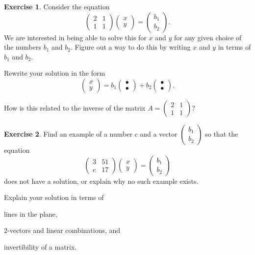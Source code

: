 \documentclass[11pt]{amsart}
\theoremstyle{definition}
\newtheorem{exercise}{Exercise}
\begin{document}
\begin{exercise}
Consider the equation
\[
\begin{pmatrix} 2 & 1 \\ 1 & 1 \end{pmatrix}\begin{pmatrix} x \\ y \end{pmatrix} = \begin{pmatrix} b_1 \\ b_2 \end{pmatrix}.
\]
We are interested in being able to solve this for $x$ and $y$ for any given choice of the numbers $b_1$ and $b_2$. Figure out a way to do this by writing $x$ and $y$ in terms of $b_1$ and $b_2$.

Rewrite your solution in the form
\[
\begin{pmatrix} x \\ y \end{pmatrix} = b_1 \begin{pmatrix} \bullet \\ \bullet\end{pmatrix} + b_2 \begin{pmatrix}  \bullet \\ \bullet \end{pmatrix}.
\]

How is this related to the inverse of the matrix $A = \left( \begin{smallmatrix} 2 & 1 \\ 1 & 1 \end{smallmatrix} \right)$?
\end{exercise}

\vspace{1cm}

\begin{exercise}
Find an example of a number $c$ and a vector $\left( \begin{smallmatrix} b_1 \\ b_2 \end{smallmatrix}\right)$ so that the equation
\[
\begin{pmatrix} 3 & 51 \\ c & 17 \end{pmatrix} \begin{pmatrix} x \\ y \end{pmatrix} = \begin{pmatrix} b_1 \\ b_2 \end{pmatrix}
\]
does not have a solution, or explain why no such example exists.

Explain your solution in terms of
\begin{compactitem}
\item lines in the plane,
\item $2$-vectors and linear combinations, and
\item invertibility of a matrix.
\end{compactitem}
\end{exercise}
\end{document}
